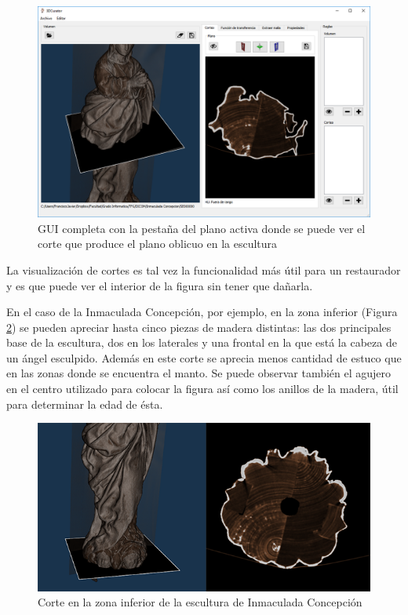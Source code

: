 \begin{figure}[H]
	\centering
	\includegraphics[width=12.5cm]{imagenes/gui_plano}
	\caption{GUI completa con la pestaña del plano activa donde se puede ver el corte que produce el plano oblicuo en la escultura}
	\label{fig:gui_plano}
\end{figure}

La visualización de cortes es tal vez la funcionalidad más útil para un restaurador y es que puede ver el interior de la figura sin tener que dañarla.

En el caso de la Inmaculada Concepción, por ejemplo, en la zona inferior (Figura \ref{fig:corte_inmaculada_concepcion_agujero}) se pueden apreciar hasta cinco piezas de madera distintas: las dos principales base de la escultura,  dos en los laterales y una frontal en la que está la cabeza de un ángel esculpido. Además en este corte se aprecia menos cantidad de estuco que en las zonas donde se encuentra el manto. Se puede observar también el agujero en el centro utilizado para colocar la figura así como los anillos de la madera, útil para determinar la edad de ésta.

\begin{figure}[H]
	\centering
	\includegraphics[width=12.5cm]{imagenes/corte_inmaculada_concepcion_agujero}
	\caption{Corte en la zona inferior de la escultura de Inmaculada Concepción}
	\label{fig:corte_inmaculada_concepcion_agujero}
\end{figure}

